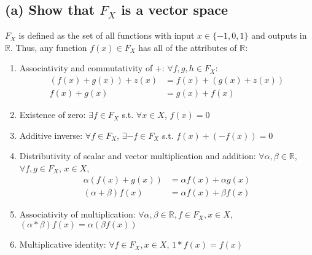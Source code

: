 \documentclass{article}
\newcommand{\R}{\mathbb{R}}
\begin{document}
\subsection*{(a) Show that $F_X$ is a vector space}
$F_X$ is defined as the set of all functions with input $x\in\{-1,0,1\}$ and outputs in $\R$. Thus, any function $f(x)\in F_X$ has all of the attributes of $\R$:
\begin{enumerate}
	\item Associativity and commutativity of $+$: $\forall f,g,h\in F_X$:
		\begin{align*}
			(f(x) + g(x)) + z(x) 	&= f(x) + (g(x) + z(x))	\\
			f(x) + g(x)				&= g(x) + f(x)
		\end{align*}
		
	\item Existence of zero: $\exists f\in F_X$ s.t. $\forall x\in X$, $f(x)=0$
	
	\item Additive inverse: $\forall f\in F_X$, $\exists -f\in F_X$ s.t. $f(x) + (-f(x)) = 0$
	
	\item Distributivity of scalar and vector multiplication and addition: $\forall\alpha,\beta\in\R$,$\forall f,g\in F_X$, $x\in X$,
		\begin{align*}
			\alpha(f(x)+g(x))		&= \alpha f(x) + \alpha g(x)	\\
			(\alpha + \beta)f(x)	&= \alpha f(x) + \beta f(x)
		\end{align*}
		
	\item Associativity of multiplication: $\forall\alpha,\beta\in\R,f\in F_X,x\in X$, $(\alpha*\beta)f(x)=\alpha(\beta f(x))$
	
	\item Multiplicative identity: $\forall f\in F_X,x\in X$, $1*f(x)=f(x)$
\end{enumerate}
\end{document}
